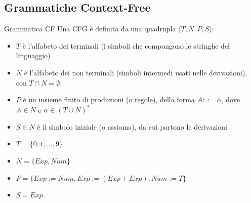 \documentclass[12pt, a4paper]{report}
\begin{document}
        \subsection{Grammatiche Context-Free}
            \begin{definitionbox}{Grammatica CF}{}
                Una CFG è definita da una quadrupla $\langle T, N, P, S \rangle$:
                \begin{itemize}
                    \item $T$ è l'alfabeto dei terminali (i simboli che compongono le stringhe del linguaggio)
                    \item $N$ è l'alfabeto dei non terminali (simboli intermedi usati nelle derivazioni), con $T \cap N = \emptyset$
                    \item $P$ è un insieme finito di produzioni (o regole), della forma $A ::= \alpha$, dove $A \in N$ e $\alpha \in (T \cup N)^*$
                    \item $S \in N$ è il simbolo iniziale (o assioma), da cui partono le derivazioni
                \end{itemize}
            \end{definitionbox}
            \begin{example}
                \begin{itemize}
                    \item $T=\{0,1,\ldots,9\}$
                    \item $N=\{Exp,Num\}$
                    \item $P=\{Exp:=Num, Exp:=(Exp+Exp), Num:=T\}$
                    \item $S=Exp$
                \end{itemize}
            \end{example}
\end{document}
